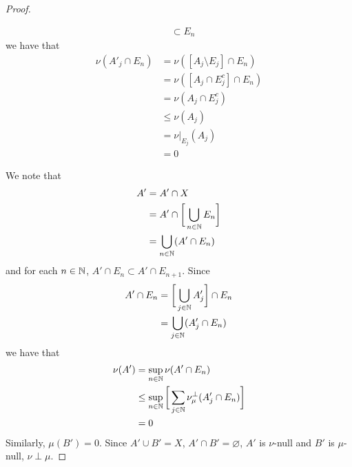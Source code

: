 \documentclass{book}
\begin{document}
\begin{proof}
\begin{itemize}
\begin{align*}
				& \subset E_n
			\end{align*}  
			we have that 
			\begin{align*}
				\nu(A'_j \cap E_n) 
				& = \nu([A_j \setminus E_j] \cap E_n) \\
				& = \nu([A_j \cap E_j^c] \cap E_n) \\
				& = \nu(A_j \cap E_j^c) \\
				& \leq \nu(A_j) \\
				& = \nu|_{E_j}(A_j) \\
				& = 0
			\end{align*}
		\end{itemize} 
		We note that
		\begin{align*}
			A'
			& = A' \cap X \\
			& = A' \cap \bigg[ \bigcup_{n \in \mathbb{N}} E_n \bigg] \\
			& = \bigcup_{n \in \mathbb{N}} (A' \cap E_n)
		\end{align*}
		and for each $n \in \mathbb{N}$, $A' \cap E_n \subset A' \cap E_{n+1}$. Since 
		\begin{align*}
			A' \cap E_n
			& = \bigg[ \bigcup_{j \in \mathbb{N}} A'_j \bigg] \cap E_n \\
			& = \bigcup_{j \in \mathbb{N}} (A'_j \cap E_n) 
		\end{align*}
		we have that
		\begin{align*}
			\nu(A')
			& = \sup\limits_{n \in \mathbb{N}} \nu(A' \cap E_n) \\
			& \leq \sup\limits_{n \in \mathbb{N}} \bigg[ \sum\limits_{j \in \mathbb{N}} \nu_{\mu}^{\perp}(A'_j \cap E_n) \bigg] \\
			& = 0
		\end{align*}
		Similarly, $\mu(B') = 0$. Since $A' \cup B' = X$, $A' \cap B' = \varnothing$, $A'$ is $\nu$-null and $B'$ is $\mu$-null, $\nu \perp \mu$.
	\end{proof}
	
	
	
	
	
	
	
	
	
	
	
	
	
	
	
	
	
	
	
	
	
	
	
	
	
	
	
	
	
	
	
\end{document}
